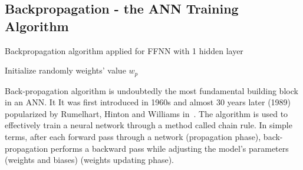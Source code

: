 \documentclass[../main.tex]{subfiles}
\begin{document}
\subsection{Backpropagation - the ANN Training Algorithm}
\label{ann_backprop_alg}

\begin{algorithm}[!t]
	\caption{Backpropagation algorithm applied for FFNN with 1 hidden layer}
	\label{algorithm_backprop}
	\SetAlgoLined
	Initialize randomly weights' value $w_p$\\ 
		
\end{algorithm}

Back-propagation algorithm is undoubtedly the most fundamental building block in an ANN. It It was first introduced in 1960s and almost 30 years later (1989) popularized by Rumelhart, Hinton and Williams in~\cite{rumelhart1988learning}. The algorithm is used to effectively train a neural network through a method called chain rule. In simple terms, after each forward pass through a network (propagation phase), back-propagation performs a backward pass while adjusting the model's parameters (weights and biases) (weights updating phase).
\end{document}
